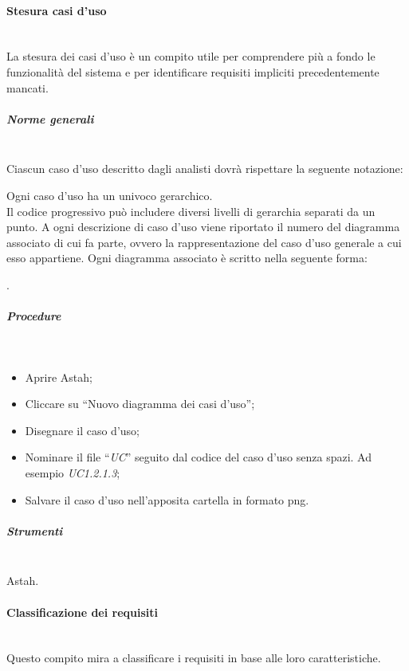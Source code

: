 \paragraph{Stesura casi d'uso} \hfill \\
La stesura dei casi d'uso è un compito utile per comprendere più a fondo le funzionalità del sistema e per identificare requisiti impliciti precedentemente mancati.

\subparagraph{Norme generali} \hfill \\

Ciascun caso d'uso descritto dagli analisti dovrà rispettare la seguente notazione:
\begin{center}
\end{center}
Ogni caso d'uso ha un  univoco gerarchico.\\
Il codice progressivo può includere diversi livelli di gerarchia separati da un punto.
A ogni descrizione di caso d'uso viene riportato il numero del diagramma associato di cui fa parte, ovvero la rappresentazione del caso d'uso generale a cui esso appartiene.
Ogni diagramma associato è scritto nella seguente forma:
\begin{center}
.
\end{center}

\subparagraph{Procedure} \hfill \\
\begin{itemize}
\item Aprire Astah;
\item Cliccare su ``Nuovo diagramma dei casi d'uso'';
\item Disegnare il caso d'uso;
\item Nominare il file ``\textit{UC}'' seguito dal codice del caso d'uso senza spazi. Ad esempio \textit{UC1.2.1.3};
\item Salvare il caso d'uso nell'apposita cartella in formato png.

\end{itemize}


\subparagraph{Strumenti} \hfill \\
Astah.



\paragraph{Classificazione dei requisiti} \hfill \\
Questo compito mira a classificare i requisiti in base alle loro caratteristiche.

